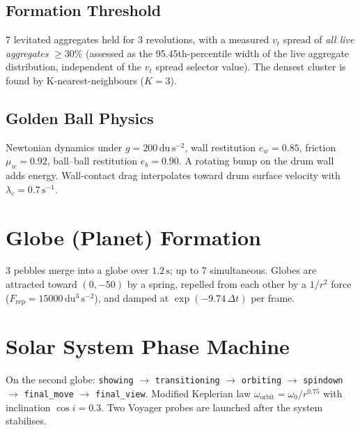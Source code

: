 \documentclass[12pt, a4paper]{article}
\newcommand{\omg}{\omega}
\begin{document}
\subsection{Formation Threshold}

7 levitated aggregates held for 3 revolutions, with a measured $v_t$ spread
of \emph{all live aggregates} $\geq 30\%$ (assessed as the
95.45th-percentile width of the live aggregate distribution, independent of
the $v_t$ spread selector value).
The densest cluster is found by K-nearest-neighbours ($K=3$).

\subsection{Golden Ball Physics}

Newtonian dynamics under $g = 200\,\mathrm{du\,s^{-2}}$, wall restitution
$e_w = 0.85$, friction $\mu_w = 0.92$, ball--ball restitution $e_b = 0.90$.
A rotating bump on the drum wall adds energy. Wall-contact drag interpolates
toward drum surface velocity with $\lambda_c = 0.7\,\mathrm{s}^{-1}$.

\section{Globe (Planet) Formation}

3 pebbles merge into a globe over $1.2\,\mathrm{s}$; up to 7 simultaneous.
Globes are attracted toward $(0, -50)$ by a spring, repelled from each other
by a $1/r^2$ force ($F_{\mathrm{rep}} = 15000\,\mathrm{du^3\,s^{-2}}$), and
damped at $\exp(-9.74\,\Delta t)$ per frame.

\section{Solar System Phase Machine}

On the second globe: \texttt{showing} $\to$ \texttt{transitioning}
$\to$ \texttt{orbiting} $\to$ \texttt{spindown} $\to$ \texttt{final\_move}
$\to$ \texttt{final\_view}. Modified Keplerian law
$\omg_{\mathrm{orbit}} = \omg_0 / r^{0.75}$ with inclination $\cos i = 0.3$.
Two Voyager probes are launched after the system stabilises.
\end{document}
